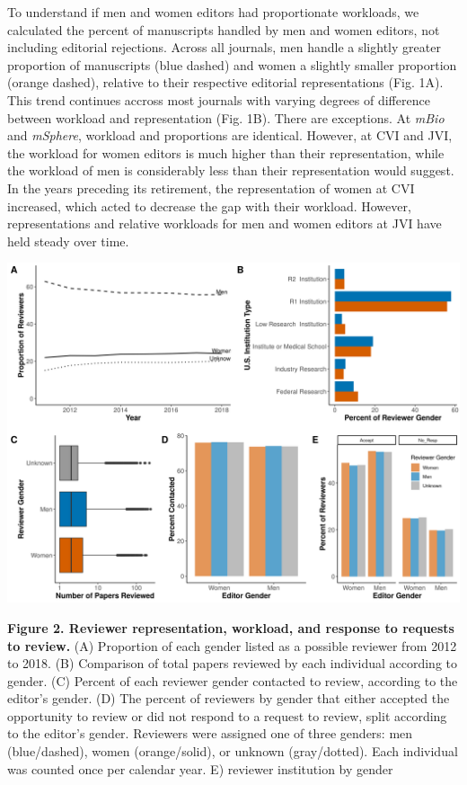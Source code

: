 \documentclass[11pt,]{article}
\begin{document}
To understand if men and women editors had proportionate workloads, we
calculated the percent of manuscripts handled by men and women editors,
not including editorial rejections. Across all journals, men handle a
slightly greater proportion of manuscripts (blue dashed) and women a
slightly smaller proportion (orange dashed), relative to their
respective editorial representations (Fig. 1A). This trend continues
accross most journals with varying degrees of difference between
workload and representation (Fig. 1B). There are exceptions. At
\emph{mBio} and \emph{mSphere}, workload and proportions are identical.
However, at CVI and JVI, the workload for women editors is much higher
than their representation, while the workload of men is considerably
less than their representation would suggest. In the years preceding its
retirement, the representation of women at CVI increased, which acted to
decrease the gap with their workload. However, representations and
relative workloads for men and women editors at JVI have held steady
over time.

\includegraphics{Figure_2.png}

\textbf{Figure 2. Reviewer representation, workload, and response to
requests to review.} (A) Proportion of each gender listed as a possible
reviewer from 2012 to 2018. (B) Comparison of total papers reviewed by
each individual according to gender. (C) Percent of each reviewer gender
contacted to review, according to the editor's gender. (D) The percent
of reviewers by gender that either accepted the opportunity to review or
did not respond to a request to review, split according to the editor's
gender. Reviewers were assigned one of three genders: men (blue/dashed),
women (orange/solid), or unknown (gray/dotted). Each individual was
counted once per calendar year. E) reviewer institution by gender
\end{document}
